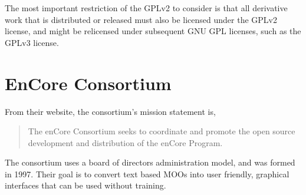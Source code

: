 \documentclass[12pt, letterpaper]{report}
\begin{document}
\par
The most important restriction of the GPLv2 to consider is that all derivative work that is distributed or released must also be licensed under the GPLv2 license, and might be relicensed under subsequent GNU GPL licenses, such as the GPLv3 license. \cite{GPLv2}

\section{EnCore Consortium}
\par

\par 
From their website, the consortium's mission statement is,

\begin{quotation}
The enCore Consortium seeks to coordinate and promote the open source development and distribution of the enCore Program.
\end{quotation}

\par
The consortium uses a board of directors administration model, and was formed in 1997. Their goal is to convert text based MOOs into user friendly, graphical interfaces that can be used without training.
\end{document}
